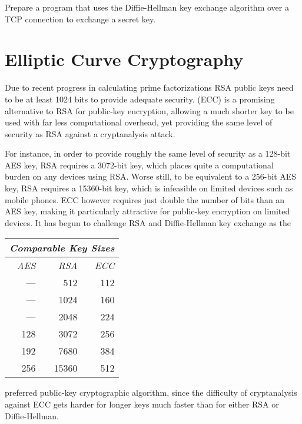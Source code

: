 \begin{exercise}
Prepare a program that uses the Diffie-Hellman key exchange algorithm over a
TCP connection to exchange a secret key.
\end{exercise}



\section{Elliptic Curve Cryptography}\label{Se:EllipticCurveCryptography}


Due to recent progress in calculating prime factorizations RSA public keys
need to be at least 1024 bits to provide adequate security.
 (ECC) is a promising alternative
to RSA for public-key encryption, allowing a much shorter key to be used
with far less computational overhead, yet providing the same level of security
as RSA against a cryptanalysis attack.

\noindent
\begin{minipage}{95mm}
  For instance, in order to provide roughly the same level of security as a
  128-bit AES key, RSA requires a 3072-bit key, which places quite a computational
  burden on any devices using RSA. Worse still, to be equivalent to
  a 256-bit AES key, RSA requires a 15360-bit key, which is infeasible on limited
  devices such as mobile phones. ECC however requires just double the number of bits
  than an AES key, making it particularly attractive for public-key encryption on limited devices. It has begun to challenge
  RSA and Diffie-Hellman key exchange as the
\end{minipage}
\hfill
\begin{tabular}{|r|r|r|} \hline
  \multicolumn{3}{|l|}{\textit{Comparable Key Sizes}} \\ \hline\hline
  \textit{AES} & \textit{RSA} & \textit{ECC} \\ \hline
  --- & 512 & 112 \\
  --- & 1024 & 160 \\
  --- & 2048 & 224 \\
  128 & 3072 & 256 \\
  192 & 7680 & 384 \\
  256 & 15360 & 512 \\\hline
\end{tabular}
preferred public-key cryptographic algorithm, since the difficulty of cryptanalysis against ECC gets harder for longer keys much faster than for either RSA or Diffie-Hellman.

